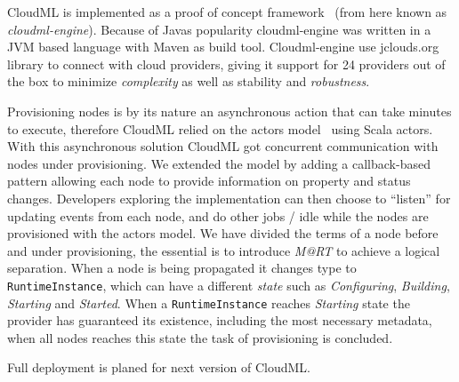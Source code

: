 CloudML is implemented as a proof of concept framework~\cite{cloudml-engine}
(from here known as \emph{cloudml-engine}). 
Because of Javas popularity cloudml-engine was written in a JVM based language with Maven as build tool.
Cloudml-engine use jclouds.org library to connect with cloud providers, giving it support
for 24 providers out of the box to minimize \emph{complexity} as well as stability and \emph{robustness}.

Provisioning nodes is by its nature an asynchronous action that can take minutes to execute,
therefore CloudML relied on the actors model~\cite{actors:haller07} using Scala actors.
With this asynchronous solution CloudML got concurrent communication with nodes under provisioning.
We extended the model by adding a callback-based pattern allowing each node to provide 
information on property and status changes.
Developers exploring the implementation can then choose to ``listen'' for updating events from each node,
and do other jobs / idle while the nodes are provisioned with the actors model.
We have divided the terms of a node before and under provisioning, the essential is to introduce 
\emph{M@RT} to achieve a logical separation.
When a node is being propagated it changes type to \texttt{RuntimeInstance}, 
which can have a different \emph{state} such as \emph{Configuring}, \emph{Building}, \emph{Starting} and \emph{Started}.
When a \texttt{RuntimeInstance} reaches \emph{Starting} state the provider has guaranteed its existence, including
the most necessary metadata, when all nodes reaches this state the task of provisioning is concluded.

Full deployment is planed for next version of CloudML.
